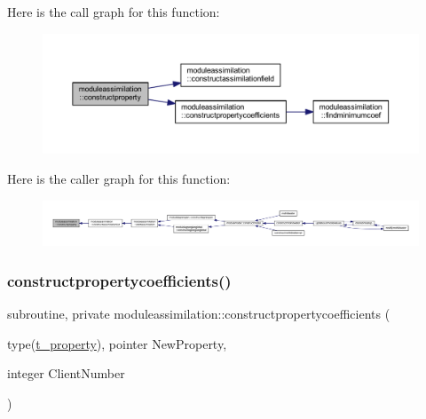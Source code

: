 Here is the call graph for this function\+:\nopagebreak
\begin{figure}[H]
\begin{center}
\leavevmode
\includegraphics[width=350pt]{namespacemoduleassimilation_af8bbe3b809fb38aac25e711c6dc7dc2e_cgraph}
\end{center}
\end{figure}
Here is the caller graph for this function\+:\nopagebreak
\begin{figure}[H]
\begin{center}
\leavevmode
\includegraphics[width=350pt]{namespacemoduleassimilation_af8bbe3b809fb38aac25e711c6dc7dc2e_icgraph}
\end{center}
\end{figure}
\mbox{\label{namespacemoduleassimilation_a1af2e006a02d8457d8516853b6a03307}} 
\subsubsection{\texorpdfstring{constructpropertycoefficients()}{constructpropertycoefficients()}}
{\footnotesize\ttfamily subroutine, private moduleassimilation\+::constructpropertycoefficients (\begin{DoxyParamCaption}\item[{type(\mbox{\hyperlink{structmoduleassimilation_1_1t__property}{t\+\_\+property}}), pointer}]{New\+Property,  }\item[{integer}]{Client\+Number }\end{DoxyParamCaption})\hspace{0.3cm}{\ttfamily [private]}}

